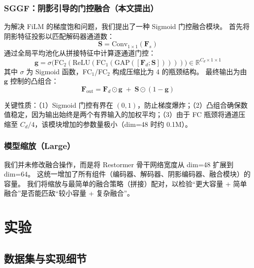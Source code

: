 \documentclass[11pt]{ctexart}
\begin{document}
\subsubsection{SGGF：阴影引导的门控融合（本文提出）}

为解决 FiLM 的梯度饱和问题，我们提出了一种 Sigmoid 门控融合模块。
首先将阴影特征投影以匹配解码器通道数：
\begin{equation}
  \mathbf{S} = \text{Conv}_{1\times1}(\mathbf{F}_s)
\end{equation}
通过全局平均池化从拼接特征中计算逐通道门控：
\begin{equation}
  \mathbf{g} = \sigma\big(\text{FC}_2(\text{ReLU}(\text{FC}_1(\text{GAP}([\mathbf{F}_d; \mathbf{S}]))))\big) \in \mathbb{R}^{C_d \times 1 \times 1}
\end{equation}
其中 $\sigma$ 为 Sigmoid 函数，FC$_1$/FC$_2$ 构成压缩比为 4 的瓶颈结构。
最终输出为由 $\mathbf{g}$ 控制的凸组合：
\begin{equation}
  \mathbf{F}_{\text{out}} = \mathbf{F}_d \odot \mathbf{g} \;+\; \mathbf{S} \odot (1 - \mathbf{g})
\end{equation}

关键性质：（1）Sigmoid 门控有界在 $(0,1)$，防止梯度爆炸；（2）凸组合确保数值稳定，因为输出始终是两个有界输入的加权平均；（3）由于 FC 瓶颈将通道压缩至 $C_d/4$，该模块增加的参数量极小（dim=48 时约 0.1M）。

\subsubsection{模型缩放（Large）}

我们并未修改融合操作，而是将 Restormer 骨干网络宽度从 dim=48 扩展到 dim=64。
这统一增加了所有组件（编码器、解码器、阴影编码器、融合模块）的容量。
我们将缩放与最简单的融合策略（拼接）配对，以检验“更大容量 + 简单融合”是否能匹敌“较小容量 + 复杂融合”。

\section{实验}

\subsection{数据集与实现细节}
\end{document}
